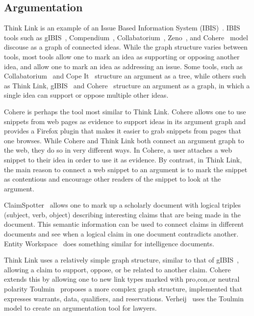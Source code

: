 \documentclass{chi2009}
\begin{document}
\subsection{Argumentation}

Think Link is an example of an Issue Based Information System (IBIS)~\cite{Rittel1973}. IBIS tools such as gIBIS~\cite{Conklin1987}, Compendium~\cite{Selvin2001}, Collabatorium~\cite{Klein2007}, Zeno~\cite{Gordon1996}, and Cohere~\cite{Shum2008} model discouse as a graph of connected ideas. While the graph structure varies between tools, most tools allow one to mark an idea as supporting or opposing another idea, and allow one to mark an idea as addressing an issue. Some tools, such as Collabatorium~\cite{Klein2007} and Cope It~\cite{Karacapilidis2001} structure an argument as a tree, while others such as Think Link, gIBIS~\cite{Conklin1987} and Cohere~\cite{Shum2008} structure an argument as a graph, in which a single idea can support or oppose multiple other ideas.

Cohere is perhaps the tool most similar to Think Link. Cohere allows one to use snippets from web pages as evidence to support ideas in its argument graph and provides a Firefox plugin that makes it easier to grab snippets from pages that one browses. While Cohere and Think Link both connect an argument graph to the web, they do so in very different ways. In Cohere, a user attaches a web snippet to their idea in order to use it as evidence. By contrast, in Think Link, the main reason to connect a web snippet to an argument is to mark the snippet as contentious and encourage other readers of the snippet to look at the argument. 

ClaimSpotter~\cite{Sereno2005,Sereno2004} allows one to mark up a scholarly document with logical triples (subject, verb, object) describing interesting claims that are being made in the document. This semantic information can be used to connect claims in different documents and see when a logical claim in one document contradicts another. Entity Workspace~\cite{Bier2006} does something similar for intelligence documents.  

Think Link uses a relatively simple graph structure, similar to that of gIBIS~\cite{Conklink1987}, allowing a claim to support, oppose, or be related to another claim. Cohere~\cite{Shum2008} extends this by allowing one to new link types marked with pro,con,or neutral polarity Toulmin~\cite{toulmin1958} proposes a more complex graph structure, implemented that expresses warrants, data, qualifiers, and reservations. Verheij~\cite{Verheij1999} uses the Toulmin model to create an argumentation tool for lawyers.
\end{document}
